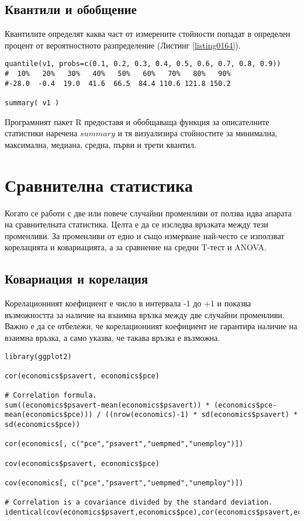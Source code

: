\subsection{Квантили и обобщение}

Квантилите определят каква част от измерените стойности попадат в определен процент от вероятностното разпределение (Листинг \ref{listing0164}).

\begin{lstlisting}[caption=Квантили и обобщение, label=listing0165]
quantile(v1, probs=c(0.1, 0.2, 0.3, 0.4, 0.5, 0.6, 0.7, 0.8, 0.9))
#  10%   20%   30%   40%   50%   60%   70%   80%   90% 
#-28.0  -0.4  19.0  41.6  66.5  84.4 110.6 121.8 150.2 

summary( v1 )
\end{lstlisting}

Програмният пакет R предоставя и обобщаваща функция за описателните статистики наречена $summary$ и тя визуализира стойностите за минимална, максимална, медиана, средна, първи и трети квантил.

\section{Сравнителна статистика}

Когато се работи с две или повече случайни променливи от ползва идва апарата на сравнителната статистика. Целта е да се изследва връзката между тези променливи. За променливи от едно и също измерване най-често се използват корелацията и ковариацията, а за сравнение на средни T-тест и ANOVA. 

\subsection{Ковариация и корелация}

Корелационният коефициент е число в интервала -1 до +1 и показва възможността за наличие на взаимна връзка между две случайни променливи. Важно е да се отбележи, че корелационният коефициент не гарантира наличие на взаимна връзка, а само указва, че такава връзка е възможна. 

\begin{lstlisting}[caption=Ковариация и корелация, label=listing0166]
library(ggplot2)

cor(economics$psavert, economics$pce)

# Correlation formula.
sum((economics$psavert-mean(economics$psavert)) * (economics$pce-mean(economics$pce))) / ((nrow(economics)-1) * sd(economics$psavert) * sd(economics$pce))

cor(economics[, c("pce","psavert","uempmed","unemploy")])

cov(economics$psavert, economics$pce)

cov(economics[, c("pce","psavert","uempmed","unemploy")])

# Correlation is a covariance divided by the standard deviation.
identical(cov(economics$psavert,economics$pce),cor(economics$psavert,economics$pce)*sd(economics$psavert)*sd(economics$pce))
\end{lstlisting}

